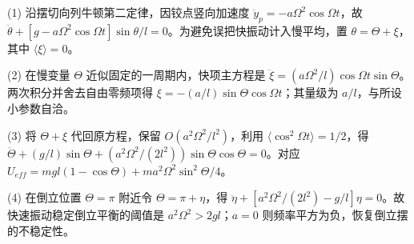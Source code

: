 (1) 沿摆切向列牛顿第二定律，因铰点竖向加速度 $\ddot y_p=-a\Omega^2\cos\Omega t$，故 $\ddot\theta+[g-a\Omega^2\cos\Omega t]\sin\theta/l=0$。为避免误把快振动计入慢平均，置 $\theta=\Theta+\xi$，其中 $\langle\xi\rangle=0$。

(2) 在慢变量 $\Theta$ 近似固定的一周期内，快项主方程是 $\ddot\xi=(a\Omega^2/l)\cos\Omega t\sin\Theta$。两次积分并舍去自由零频项得 $\xi=-(a/l)\sin\Theta\cos\Omega t$；其量级为 $a/l$，与所设小参数自洽。

(3) 将 $\Theta+\xi$ 代回原方程，保留 $O(a^2\Omega^2/l^2)$，利用 $\langle\cos^2\Omega t\rangle=1/2$，得 $\ddot\Theta+(g/l)\sin\Theta+(a^2\Omega^2/(2l^2))\sin\Theta\cos\Theta=0$。对应 $U_{eff}=mgl(1-\cos\Theta)+ma^2\Omega^2\sin^2\Theta/4$。

(4) 在倒立位置 $\Theta=\pi$ 附近令 $\Theta=\pi+\eta$，得 $\ddot\eta+[a^2\Omega^2/(2l^2)-g/l]\eta=0$。故快速振动稳定倒立平衡的阈值是 $a^2\Omega^2>2gl$；$a=0$ 则频率平方为负，恢复倒立摆的不稳定性。
